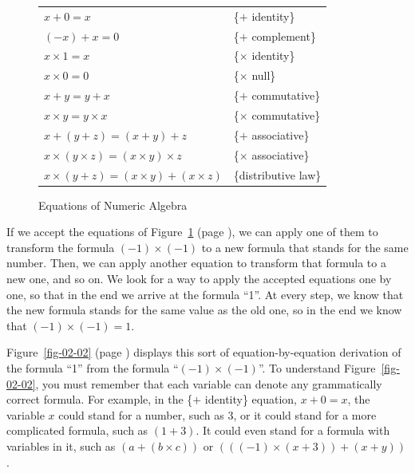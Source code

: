 \begin{figure}
\begin{center}
\begin{tabular}{ll}
$x+0 = x$                 & \{$+$ identity\} \\
$(-x)+ x = 0$             & \{$+$ complement\} \\
$x \times 1 = x$          & \{$\times$ identity\} \\
$x \times 0 = 0$          & \{$\times$ null\} \\
$x+y = y+x$               & \{$+$ commutative\} \\
$x \times y = y \times x$ & \{$\times$ commutative\} \\
$x+(y+z) = (x+y)+z$       & \{$+$ associative\} \\
$x \times (y \times z) = (x \times y) \times z$ & \{$\times$ associative\} \\
$x\times(y+z) = (x \times y)+(x \times z)$      & \{distributive law\} \\
\end{tabular}
\end{center}
\caption{Equations of Numeric Algebra}
\label{fig-02-01}
\end{figure}

If we accept the equations of Figure~\ref{fig-02-01} (page \pageref{fig-02-01}),
we can apply one of them to transform the formula $(-1)\times(-1)$ to a new formula that
stands for the same number. Then, we can apply another equation to
transform that formula to a new one, and so on.
We look for a way to apply the
accepted equations one by one, so that in the end we
arrive at the formula ``1''. At every step, we know that the
new formula stands for the same value as the old one, so in
the end we know that $(-1)\times(-1) = 1$.

Figure~\ref{fig-02-02} (page \pageref{fig-02-02})
displays this sort of equation-by-equation derivation of the
formula ``1'' from the formula ``$(-1)\times(-1)$''. To
understand Figure~\ref{fig-02-02}, you must remember that each
variable can denote any
grammatically correct formula. For example, in the
\{$+$ identity\} equation, $x + 0 = x$, the variable $x$ could stand for
a number, such as 3, or it could stand for a more complicated
formula, such as $(1 + 3)$. It could even stand for a formula
with variables in it, such as $(a + (b \times c))$ or
$(((-1) \times (x + 3)) + (x + y))$.

